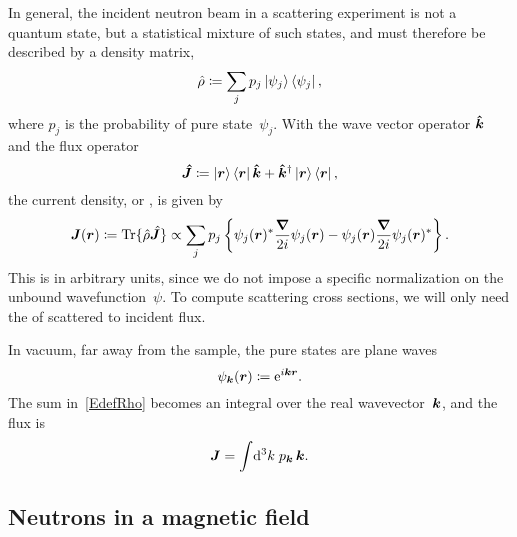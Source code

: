 In general, the incident neutron beam in a scattering experiment
is not a  quantum state,
%
%
but a statistical mixture of such states,
%
and must therefore be described by a density matrix,
%
%
\begin{equation}\label{EdefRho}
  \hat\rho \coloneqq \sum_j p_j \ket{\psi_j}\bra{\psi_j},
\end{equation}
where $p_j$ is the probability of pure state~$\psi_j$.
%
With the wave vector operator $\bm{\hat k}$
%
and the flux operator
\begin{equation}\label{EdefJop}
  \bm{\hat J} \coloneqq  \ket{\bm{r}}\bra{\bm{r}}\bm{\hat k} + \bm{\hat k}^\dagger\ket{\bm{r}}\bra{\bm{r}},
\end{equation}
the current density, or ,
%
%
is given by
\begin{equation}\label{EdefJ}
  \bm{J}(\bm{r})
  \coloneqq \operatorname{Tr}\{\hat\rho \hat{\bm{J}}\}
  \propto \sum_j p_j\left\{ \psi_j(\bm{r})^*\frac{\bm{\nabla}}{2i}\psi_j(\bm{r})
                        - \psi_j(\bm{r})\frac{\bm{\nabla}}{2i}\psi_j(\bm{r})^*\right\}.
\end{equation}
%
This is in arbitrary units,
%
since we do not impose a specific normalization
%
on the unbound wavefunction~$\psi$.
To compute scattering cross sections,
%
%
we will only need the  of scattered to incident flux.

In vacuum, far away from the sample, the pure states are plane waves
%
%
\begin{equation}\label{EplaneWave}
  \psi_{\bm{k}}(\bm{r})\coloneqq\mathrm e^{i{\bm{k}}\bm{r}}.
\end{equation}
The sum in~\cref{EdefRho} becomes an integral over the real wavevector~${\bm{k}}$,
and the flux is
\begin{equation}
  \bm{J} = \int\!\mathrm d^3k\; p_{\bm{k}}\, {\bm{k}}.
\end{equation}

\subsection{Neutrons in a magnetic field}\label{SnSpinor}

